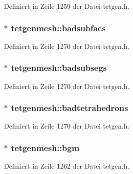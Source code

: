 Definiert in Zeile 1259 der Datei tetgen.\-h.

\hypertarget{classtetgenmesh_a5e4083990698cca66aee54fc110dd288}{
\subsubsection[{badsubfacs}]{ $\ast$ tetgenmesh\-::badsubfacs}}\label{classtetgenmesh_a5e4083990698cca66aee54fc110dd288}


Definiert in Zeile 1270 der Datei tetgen.\-h.

\hypertarget{classtetgenmesh_ac43e4dd0213f6b589fade06bf09a8d8c}{
\subsubsection[{badsubsegs}]{ $\ast$ tetgenmesh\-::badsubsegs}}\label{classtetgenmesh_ac43e4dd0213f6b589fade06bf09a8d8c}


Definiert in Zeile 1270 der Datei tetgen.\-h.

\hypertarget{classtetgenmesh_a04983fc27254c1b6a1456862293f74bb}{
\subsubsection[{badtetrahedrons}]{$\ast$ tetgenmesh\-::badtetrahedrons}}\label{classtetgenmesh_a04983fc27254c1b6a1456862293f74bb}


Definiert in Zeile 1270 der Datei tetgen.\-h.

\hypertarget{classtetgenmesh_a7e3caf366c729754f62b410a8fd16c6d}{
\subsubsection[{bgm}]{$\ast$ tetgenmesh\-::bgm}}\label{classtetgenmesh_a7e3caf366c729754f62b410a8fd16c6d}


Definiert in Zeile 1262 der Datei tetgen.\-h.

